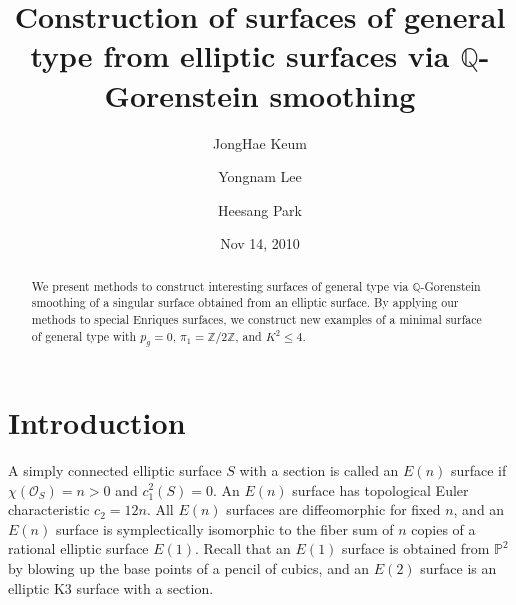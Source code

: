 \documentclass[twoside,11pt]{amsart}
\begin{document}
\title[Construction of surfaces of general type]
{Construction of surfaces of general type from elliptic surfaces
via $\mathbb{Q}$-Gorenstein smoothing }

\author{JongHae Keum}

\address{Korea Institute for Advanced Study, 207-43 Cheongnyangni-dong,
         Seoul 130-722, Korea}


\author{Yongnam Lee}

\address{Department of Mathematics, Sogang University,
         Sinsu-dong, Mapo-gu, Seoul 121-742, and
         Korea Institute for Advanced Study, 207-43 Cheongnyangni-dong,
         Seoul 130-722, Korea}


\author{Heesang Park}

\address{Korea Institute for Advanced Study, 207-43 Cheongnyangni-dong,
         Seoul 130-722, Korea}


\date{Nov 14, 2010}



\begin{abstract}
We present methods to construct interesting surfaces of general
type via $\mathbb{Q}$-Gorenstein smoothing of a singular surface
obtained from an elliptic surface. By applying our methods to
special Enriques surfaces, we construct new examples of a minimal
surface of general type with $p_g=0$,
$\pi_1=\mathbb{Z}/2\mathbb{Z}$, and $K^2\le 4$.
\end{abstract}

\maketitle

\section{Introduction}
\label{sec-1}

A simply connected elliptic surface $S$ with a section is called an
$E(n)$ surface if $\chi({\mathcal O}_S)=n>0$ and $c_1^2(S)=0$. An
$E(n)$ surface has topological Euler characteristic $c_2=12n$. All
$E(n)$ surfaces are diffeomorphic for fixed $n$, and an $E(n)$
surface is symplectically isomorphic to the fiber sum of $n$ copies
of a rational elliptic surface $E(1)$. Recall that an $E(1)$ surface
is obtained from ${{\mathbb P}}^2$ by blowing up the base points of a pencil
of cubics, and an $E(2)$ surface is an elliptic K3 surface with a
section.
\end{document}
